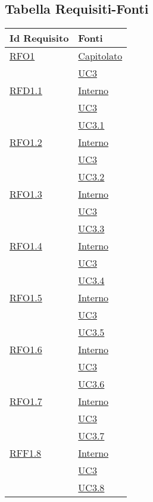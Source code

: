 \subsection{Tabella Requisiti-Fonti}
\normalsize
\begin{longtable}{|>{\centering}m{5cm}|m{5cm}<{\centering}|}
\hline 
\textbf{Id Requisito} & \textbf{Fonti}\\
\hline
\endhead
\hyperlink{RFO1}{RFO1} & \hyperlink{Capitolato}{Capitolato}\\
& \hyperref[UC3]{UC3}\\ \hline

\hyperlink{RFD1.1}{RFD1.1} & \hyperlink{Interno}{Interno}\\
& \hyperref[UC3]{UC3}\\
& \hyperref[UC3.1]{UC3.1}\\ \hline

\hyperlink{RFD1.2}{RFO1.2} & \hyperlink{Interno}{Interno}\\
& \hyperref[UC3]{UC3}\\
& \hyperref[UC3.2]{UC3.2}\\ \hline

\hyperlink{RFO1.3}{RFO1.3} & \hyperlink{Interno}{Interno}\\
& \hyperref[UC3]{UC3}\\
& \hyperref[UC3.3]{UC3.3}\\ \hline

\hyperlink{RFO1.4}{RFO1.4} & \hyperlink{Interno}{Interno}\\
& \hyperref[UC3]{UC3}\\
& \hyperref[UC3.4]{UC3.4}\\ \hline

\hyperlink{RFO1.5}{RFO1.5} & \hyperlink{Interno}{Interno}\\
& \hyperref[UC3]{UC3}\\
& \hyperref[UC3.5]{UC3.5}\\ \hline

\hyperlink{RFO1.6}{RFO1.6} & \hyperlink{Interno}{Interno}\\
& \hyperref[UC3]{UC3}\\
& \hyperref[UC3.6]{UC3.6}\\ \hline

\hyperlink{RFO1.7}{RFO1.7} & \hyperlink{Interno}{Interno}\\
& \hyperref[UC3]{UC3}\\
& \hyperref[UC3.7]{UC3.7}\\ \hline

\hyperlink{RFF1.8}{RFF1.8} & \hyperlink{Interno}{Interno}\\
& \hyperref[UC3]{UC3}\\
& \hyperref[UC3.8]{UC3.8}\\ \hline


\end{longtable}
